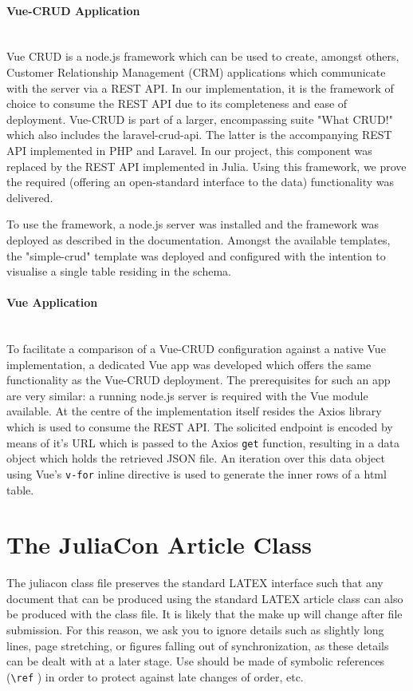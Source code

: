 \documentclass{juliacon}
\begin{document}
\paragraph{Vue-CRUD Application}\hfill\\

Vue CRUD is a node.js framework which can be used to create, amongst others, Customer Relationship Management (CRM) applications which communicate with the server via a REST API. In our implementation, it is the framework of choice to consume the REST API due to its completeness and ease of deployment. Vue-CRUD is part of a larger, encompassing suite "What CRUD!" which also includes the laravel-crud-api. The latter is the accompanying REST API implemented in PHP and Laravel. In our project, this component was replaced by the REST API implemented in Julia. Using this framework, we prove the required (offering an open-standard interface to the data) functionality was delivered. \vskip 6pt

To use the framework, a node.js server was installed and the framework was deployed as described in the documentation. Amongst the available templates, the "simple-crud" template was deployed and configured with the intention to visualise a single table residing in the schema.\vskip 6pt


\paragraph{Vue Application}\hfill\\

To facilitate a comparison of a Vue-CRUD configuration against a native Vue implementation, a dedicated Vue app was developed which offers the same functionality as the Vue-CRUD deployment. The prerequisites for such an app are very similar: a running node.js server is required with the Vue module available. At the centre of the implementation itself resides the Axios \cite{todo} library which is used to consume the REST API. The solicited endpoint is encoded by means of it's URL which is passed to the Axios \texttt{get} function, resulting in a data object which holds the retrieved JSON file. An iteration over this data object using Vue's \texttt{v-for} inline directive is used to generate the inner rows of a html table.\vskip 6pt

\section{The JuliaCon Article Class}
\label{sec:documentclass}
%
The juliacon class file preserves the standard LATEX{} interface such
that any document that can be produced using the standard LATEX{}
article class can also be produced with the class file.\vskip 6pt
It is likely that the make up will change after file submission. For
this reason, we ask you to ignore details such as slightly long lines,
page stretching, or figures falling out of synchronization, as these
details can be dealt with at a later stage.\vskip 6pt
Use should be made of symbolic references (\verb|\ref| ) in order to
protect against late changes of order, etc.
\end{document}

